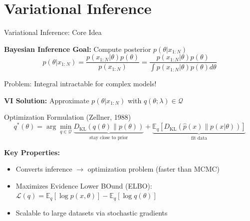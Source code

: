 \documentclass[aspectratio=169, 12pt]{beamer}
\begin{document}
\section{Variational Inference}
\begin{frame}{Variational Inference: Core Idea}

\textbf{Bayesian Inference Goal:} Compute posterior \(p(\theta|x_{1:N})\)
\[
p(\theta|x_{1:N}) = \frac{p(x_{1:N}|\theta)p(\theta)}{p(x_{1:N})} = \frac{p(x_{1:N}|\theta)p(\theta)}{\int p(x_{1:N}|\theta)p(\theta)d\theta}
\]

\alert{Problem:} Integral intractable for complex models!

\vspace{0.4cm}

\textbf{VI Solution:} Approximate \(p(\theta|x_{1:N})\) with \(q(\theta; \lambda) \in \mathcal{Q}\)

\begin{block}{Optimization Formulation (Zellner, 1988)}
\[
q^*(\theta) = \arg\min_{q \in \mathcal{Q}} \underbrace{D_{\text{KL}}(q(\theta) \| p(\theta))}_{\text{stay close to prior}} + \underbrace{\mathbb{E}_q[D_{\text{KL}}(\hat{p}(x) \| p(x|\theta))]}_{\text{fit data}}
\]
\end{block}

\vspace{0.3cm}

\textbf{Key Properties:}
\begin{itemize}
    \item Converts inference \(\rightarrow\) optimization problem (faster than MCMC)
    \item Maximizes Evidence Lower BOund (ELBO): \(\mathcal{L}(q) = \mathbb{E}_q[\log p(x, \theta)] - \mathbb{E}_q[\log q(\theta)]\)
    \item Scalable to large datasets via stochastic gradients
\end{itemize}

\end{frame}
\end{document}
